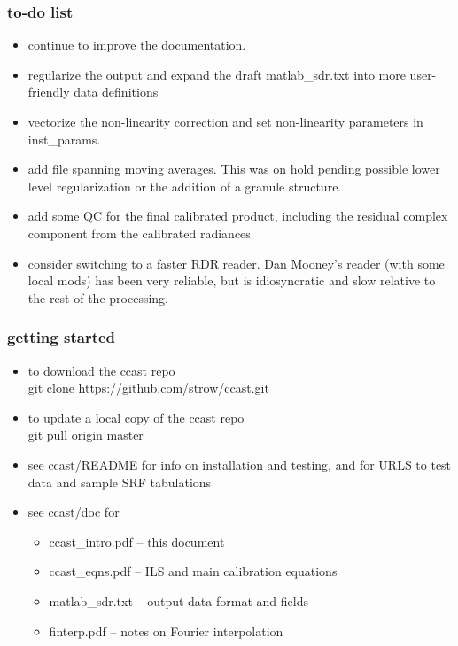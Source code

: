 \documentclass[11pt]{beamer}
\begin{document}
\begin{frame}
\frametitle{to-do list}

\begin{itemize}
  \item continue to improve the documentation.

  \item regularize the output and expand the draft matlab\_sdr.txt
    into more user-friendly data definitions

  \item vectorize the non-linearity correction and set non-linearity
    parameters in inst\_params.

  \item add file spanning moving averages.  This was on hold pending
    possible lower level regularization or the addition of a granule
    structure.

  \item add some QC for the final calibrated product, including the
    residual complex component from the calibrated radiances

  \item consider switching to a faster RDR reader.  Dan Mooney's
    reader (with some local mods) has been very reliable, but is
    idiosyncratic and slow relative to the rest of the processing.

\end{itemize}

\end{frame}
\begin{frame}
\frametitle{getting started}

\begin{itemize} 
   \item to download the ccast repo \\ 
     \hspace{10pt} git clone https://github.com/strow/ccast.git
   \item to update a local copy of the ccast repo \\ 
     \hspace{10pt} git pull origin master
   \item see ccast/README for info on installation and testing, and
     for URLS to test data and sample SRF tabulations
   \item see ccast/doc for
     \begin{itemize}
       \item ccast\_intro.pdf -- this document
       \item ccast\_eqns.pdf -- ILS and main calibration equations
       \item matlab\_sdr.txt -- output data format and fields
       \item finterp.pdf -- notes on Fourier interpolation
     \end{itemize} 
\end{itemize} 

\end{frame}
\end{document}
